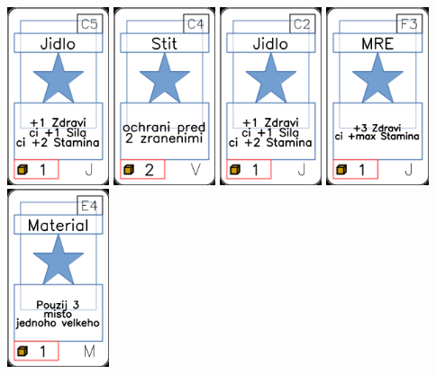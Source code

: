 \documentclass[a4paper]{article}
\begin{document}
	\includegraphics[width=3.0cm]{img-1_14}
	\includegraphics[width=3.0cm]{img-1_73}
	\includegraphics[width=3.0cm]{img-1_11}
	\includegraphics[width=3.0cm]{img-1_27}
	\includegraphics[width=3.0cm]{img-1_53}
\end{document}
